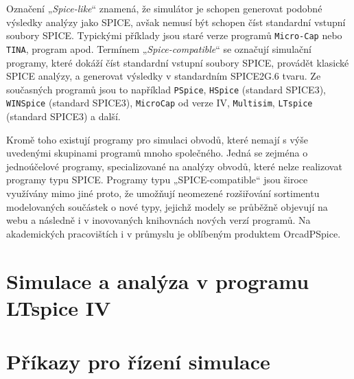     Označení „\emph{Spice-like}“ znamená, že simulátor je schopen generovat podobné výsledky 
    analýzy jako SPICE, avšak nemusí být schopen číst standardní vstupní soubory SPICE. Typickými 
    příklady jsou staré verze programů \texttt{Micro-Cap} nebo \texttt{TINA}, program apod. Termínem
    „\emph{Spice-compatible}“ se označují simulační programy, které dokáží číst standardní vstupní 
    soubory SPICE, provádět klasické SPICE analýzy, a generovat výsledky v standardním SPICE2G.6 
    tvaru. Ze současných programů jsou to například \texttt{PSpice}, \texttt{HSpice} (standard 
    SPICE3), \texttt{WINSpice} (standard SPICE3), \texttt{MicroCap} od verze IV, \texttt{Multisim}, 
    \texttt{LTspice} (standard SPICE3) a další.

    Kromě toho existují programy pro simulaci obvodů, které nemají s výše uvedenými skupinami 
    programů mnoho společného. Jedná se zejména o jednoúčelové programy, specializované na analýzy 
    obvodů, které nelze realizovat programy typu SPICE. Programy typu „SPICE-compatible“ jsou široce
    využívány mimo jiné proto, že umožňují neomezené rozšiřování sortimentu modelovaných součástek 
    o nové typy, jejichž modely se průběžně objevují na webu a následně i v inovovaných knihovnách 
    nových verzí programů. Na akademických pracovištích i v průmyslu je oblíbeným produktem
    OrcadPSpice.\cite[s.~10]{Biolek2}

  \section{Simulace a analýza v programu LTspice IV}
   
  \section{Příkazy pro řízení simulace}
    
